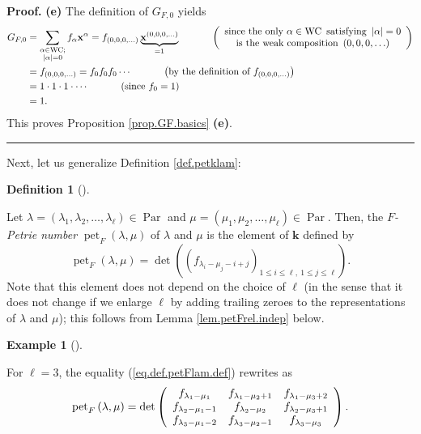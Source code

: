 \documentclass[numbers=enddot,12pt,final,onecolumn,notitlepage]{scrartcl}%
\theoremstyle{definition}
\newtheorem{defi}[theo]{Definition}
\newenvironment{definition}[1][]
{\begin{defi}[#1]\begin{leftbar}}
{\end{leftbar}\end{defi}}
\newtheorem{exam}[theo]{Example}
\newenvironment{example}[1][]
{\begin{exam}[#1]\begin{leftbar}}
{\end{leftbar}\end{exam}}
\newenvironment{proof}[1][Proof]{\noindent\textbf{#1.} }{\ \rule{0.5em}{0.5em}}
\let\sumnonlimits\sum
\renewcommand{\sum}{\sumnonlimits\limits}
\newenvironment{verlong}{}{}
\begin{document}
\begin{verlong}
\begin{proof}
\textbf{(e)} The definition of $G_{F,0}$ yields%
\begin{align*}
G_{F,0}  &  =\sum_{\substack{\alpha\in\operatorname*{WC};\\\left\vert
\alpha\right\vert =0}}f_{\alpha}\mathbf{x}^{\alpha}=f_{\left(  0,0,0,\ldots
\right)  }\underbrace{\mathbf{x}^{\left(  0,0,0,\ldots\right)  }}%
_{=1}\ \ \ \ \ \ \ \ \ \ \left(
\begin{array}
[c]{c}%
\text{since the only }\alpha\in\operatorname*{WC}\text{ satisfying }\left\vert
\alpha\right\vert =0\\
\text{is the weak composition }\left(  0,0,0,\ldots\right)
\end{array}
\right) \\
&  =f_{\left(  0,0,0,\ldots\right)  }=f_{0}f_{0}f_{0}\cdots
\ \ \ \ \ \ \ \ \ \ \left(  \text{by the definition of }f_{\left(
0,0,0,\ldots\right)  }\right) \\
&  =1\cdot1\cdot1\cdot\cdots\ \ \ \ \ \ \ \ \ \ \left(  \text{since }%
f_{0}=1\right) \\
&  =1.
\end{align*}
This proves Proposition \ref{prop.GF.basics} \textbf{(e)}.
\end{proof}
\end{verlong}

Next, let us generalize Definition \ref{def.petklam}:

\begin{definition}
\label{def.petFlam}Let $\lambda=\left(  \lambda_{1},\lambda_{2},\ldots
,\lambda_{\ell}\right)  \in\operatorname*{Par}$ and $\mu=\left(  \mu_{1}%
,\mu_{2},\ldots,\mu_{\ell}\right)  \in\operatorname*{Par}$. Then, the
$F$\emph{-Petrie number} $\operatorname*{pet}\nolimits_{F}\left(  \lambda
,\mu\right)  $ of $\lambda$ and $\mu$ is the element of $\mathbf{k}$ defined
by%
\begin{equation}
\operatorname*{pet}\nolimits_{F}\left(  \lambda,\mu\right)  =\det\left(
\left(  f_{\lambda_{i}-\mu_{j}-i+j}\right)  _{1\leq i\leq\ell,\ 1\leq
j\leq\ell}\right)  . \label{eq.def.petFlam.def}%
\end{equation}
Note that this element does not depend on the choice of $\ell$ (in the sense
that it does not change if we enlarge $\ell$ by adding trailing zeroes to the
representations of $\lambda$ and $\mu$); this follows from Lemma
\ref{lem.petFrel.indep} below.
\end{definition}

\begin{example}
For $\ell=3$, the equality (\ref{eq.def.petFlam.def}) rewrites as%
\[
\operatorname*{pet}\nolimits_{F}\left(  \lambda,\mu\right)  =\det\left(
\begin{array}
[c]{ccc}%
f_{\lambda_{1}-\mu_{1}} & f_{\lambda_{1}-\mu_{2}+1} & f_{\lambda_{1}-\mu
_{3}+2}\\
f_{\lambda_{2}-\mu_{1}-1} & f_{\lambda_{2}-\mu_{2}} & f_{\lambda_{2}-\mu
_{3}+1}\\
f_{\lambda_{3}-\mu_{1}-2} & f_{\lambda_{3}-\mu_{2}-1} & f_{\lambda_{3}-\mu
_{3}}%
\end{array}
\right)  .
\]

\end{example}
\end{document}

